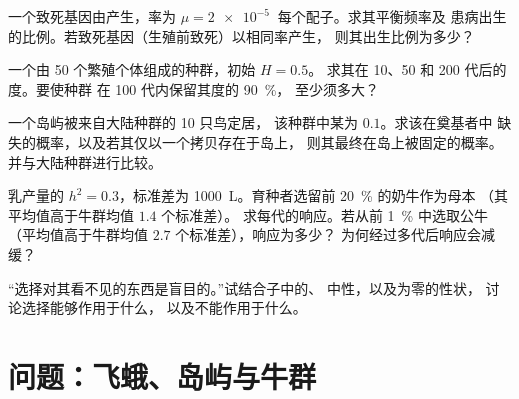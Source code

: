 \begin{exercise}[$\star\star$]\label{exo:b2:population-genetics:8}
一个致死基因由产生，率为 $\mu = \qty{2e-5}{}$
每个配子。求其平衡频率及
患病出生的比例。若致死基因（生殖前致死）以相同率产生，
则其出生比例为多少？
\end{exercise}

\begin{exercise}[$\star\star$]\label{exo:b2:population-genetics:9}
一个由 50 个繁殖个体组成的种群，初始 $H = 0.5$。
求其在 10、50 和 200 代后的度。要使种群
在 100 代内保留其度的 \qty{90}{\%}，
至少须多大？
\end{exercise}

\begin{exercise}[$\star\star\star$]\label{exo:b2:population-genetics:10}
一个岛屿被来自大陆种群的 10 只鸟定居，
该种群中某为 $0.1$。求该在奠基者中
缺失的概率，以及若其仅以一个拷贝存在于岛上，
则其最终在岛上被固定的概率。
并与大陆种群进行比较。
\end{exercise}

\begin{exercise}[$\star\star\star$]\label{exo:b2:population-genetics:11}
乳产量的 $h^{2} = 0.3$，标准差为
\qty{1000}{L}。育种者选留前 \qty{20}{\%} 的奶牛作为母本
（其平均值高于牛群均值 $1.4$ 个标准差）。
求每代的响应。若从前 
\qty{1}{\%} 中选取公牛（平均值高于牛群均值 $2.7$ 个标准差），响应为多少？
为何经过多代后响应会减缓？
\end{exercise}

\begin{exercise}[$\star\star\star$]\label{exo:b2:population-genetics:12}
“选择对其看不见的东西是盲目的。”试结合子中的、
中性，以及为零的性状，
讨论选择能够作用于什么，
以及不能作用于什么。
\end{exercise}

\section{问题：飞蛾、岛屿与牛群}

